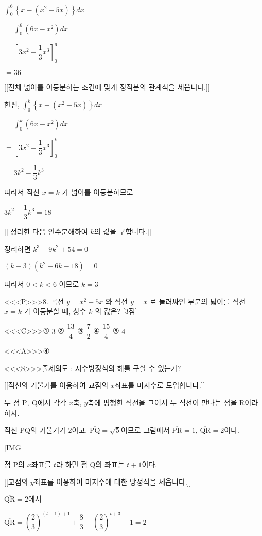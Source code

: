 \documentclass{oblivoir}
\begin{document}
$\displaystyle\int_{0}^{6}\left\{x-\left(x^{2}-5 x\right)\right\} d x$

$=\displaystyle\int_{0}^{6}\left(6 x-x^{2}\right) d x$

$=\left[3 x^{2}-\dfrac{1}{3} x^{3}\right]_{0}^{6}$

$=36$

[[전체 넓이를 이등분하는 조건에 맞게 정적분의 관계식을 세웁니다.]]

한편, $\displaystyle\int_{0}^{k}\left\{x-\left(x^{2}-5 x\right)\right\} d x$

$=\displaystyle\int_{0}^{k}\left(6 x-x^{2}\right) d x$

$=\left[3 x^{2}-\dfrac{1}{3} x^{3}\right]_{0}^{k}$

$=3 k^{2}-\dfrac{1}{3} k^{3}$

따라서 직선 $x=k$ 가 넓이를 이등분하므로

$3 k^{2}-\dfrac{1}{3} k^{3} =18$

[[[정리한 다음 인수분해하여 $k$의 값을 구합니다.]]

정리하면 $k^{3}-9 k^{2}+54=0$

$(k-3)\left(k^{2}-6 k-18\right)=0$

따라서 $0< k< 6$ 이므로 $k=3$

<<<P>>>8. 곡선 $y=x^{2}-5 x$ 와 직선 $y=x$ 로 둘러싸인 부분의 넓이를 직선 $x=k$ 가 이등분할 때, 상수 $k$ 의 값은? [3점]

<<<C>>>① $3$
② $\dfrac{13}{4}$
③ $\dfrac{7}{2}$
④ $\dfrac{15}{4}$
⑤ $4$

<<<A>>>④

<<<S>>>출제의도 : 지수방정식의 해를 구할 수 있는가?

[[직선의 기울기를 이용하여 교점의 $x$좌표를 미지수로 도입합니다.]]

두 점 $\mathrm{P},\:\mathrm{Q}$에서 각각 $x$축, $y$축에 평행한 직선을 그어서 두 직선이 만나는 점을 $\mathrm{R}$이라 하자.

직선 $\mathrm{PQ}$의 기울기가 $2$이고, $\overline{\mathrm{PQ}}=\sqrt{5}$이므로 그림에서 $\overline{\mathrm{PR}}=1$, $\overline{\mathrm{QR}}=2$이다.

[IMG]

점 $\mathrm{P}$의 $x$좌표를 $t$라 하면 점 $\mathrm{Q}$의 좌표는 $t+1$이다.

[[교점의 $y$좌표를 이용하여 미지수에 대한 방정식을 세웁니다.]]

$\overline{\mathrm{QR}}=2$에서 

$\overline{\mathrm{QR}}=\left(\dfrac{2}{3}\right)^{(t+1)+1}+\dfrac{8}{3}-\left(\dfrac{2}{3}\right)^{t+3}-1=2$
\end{document}
